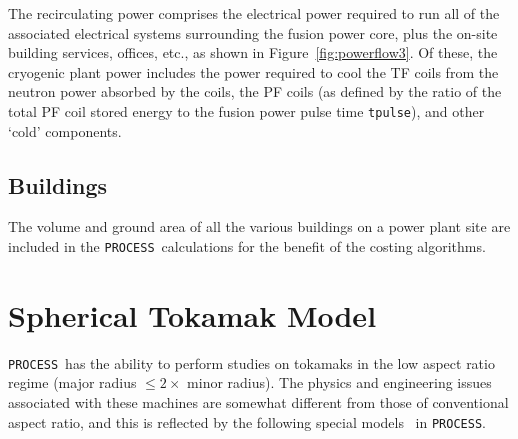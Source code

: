 \documentclass[11pt,a4paper]{report}
\newcommand{\process}{\mbox{\texttt{PROCESS}}}
\begin{document}
The recirculating power comprises the electrical power required to run all of
the associated electrical systems surrounding the fusion power core, plus the
on-site building services, offices, etc., as shown in
Figure~\ref{fig:powerflow3}. Of these, the cryogenic plant power includes the
power required to cool the TF coils from the neutron power absorbed by the
coils, the PF coils (as defined by the ratio of the total PF coil stored
energy to the fusion power pulse time \texttt{tpulse}), and other `cold'
components.

\subsection{Buildings}

The volume and ground area of all the various buildings on a power plant site
are included in the \process\ calculations for the benefit of the costing
algorithms. %

\section{Spherical Tokamak Model}
\label{sec:tart}

\process\ has the ability to perform studies on tokamaks in the low aspect ratio
regime (major radius $\leq 2 \times$ minor radius). The physics and
engineering issues~\cite{tart} associated with these machines are somewhat
different from those of conventional aspect ratio, and this is reflected by
the following special models~\cite{storac} in \process.
\end{document}
